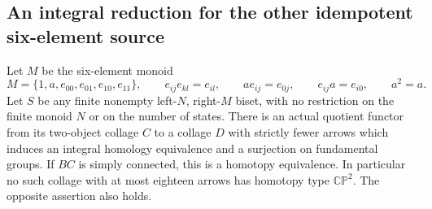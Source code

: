 \subsection{An integral reduction for the other idempotent six-element source}

\begin{theorem}[Proved]
\label{CP2:A-six-constant-idempotent-integral-reduction}
Let $M$ be the six-element monoid
\[
 M=\{1,a,e_{00},e_{01},e_{10},e_{11}\},\qquad
 e_{ij}e_{kl}=e_{il},\qquad
 ae_{ij}=e_{0j},\qquad e_{ij}a=e_{i0},\qquad a^2=a.
\]
Let $S$ be any finite nonempty left-$N$, right-$M$ biset, with no
restriction on the finite monoid $N$ or on the number of states.
There is an actual quotient functor from its two-object collage $C$
to a collage $D$ with strictly fewer arrows which induces an integral
homology equivalence and a surjection on fundamental groups.
If $BC$ is simply connected, this is a homotopy equivalence.
In particular no such collage with at most eighteen arrows has
homotopy type $\mathbb{CP}^2$.  The opposite assertion also holds.
\end{theorem}
